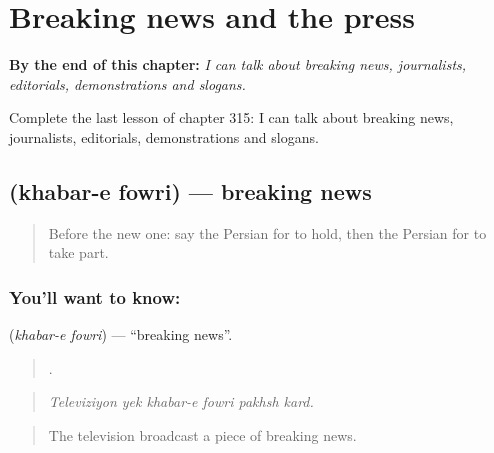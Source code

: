 
\chapter{Breaking news and the press}
\label{ch:fa-breaking-news-and-the-press}

\begin{chapteropening}
\textbf{By the end of this chapter:} \emph{I can talk about breaking news, journalists, editorials, demonstrations and slogans.}

Complete the last lesson of chapter 315: I can talk about breaking news, journalists, editorials, demonstrations and slogans.
\end{chapteropening}

\section[\texorpdfstring{\fa{خبر} \fa{فوری} (khabar-e fowri)}{خبر فوری (khabar-e fowri)}]{  (khabar-e fowri) — breaking news}

\label{lesson:FA-C315-khabar-e-fowri}



\begin{quote}
Before the new one: say the Persian for to hold, then the Persian for to take part.
\end{quote}

\subsection*{You'll want to know:  }
\textbf{ } (\emph{khabar-e fowri}) — \textquotedblleft{}breaking news\textquotedblright{}.

\begin{quote}
     .
\end{quote}

\begin{quote}
\emph{Televiziyon yek khabar-e fowri pakhsh kard.}
\end{quote}

\begin{quote}
The television broadcast a piece of breaking news.
\end{quote}

